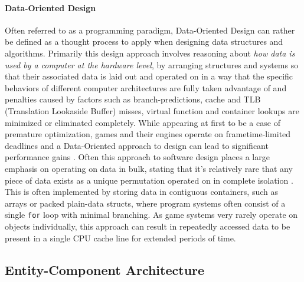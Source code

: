 \documentclass[10pt]{scrartcl}
\begin{document}
	\paragraph{Data-Oriented Design} %
	\label{par:data_oriented_design}
	Often referred to as a programming paradigm, Data-Oriented Design can rather be defined as a thought process to apply when designing data structures and algorithms. Primarily this design approach involves reasoning about \textit{how data is used by a computer at the hardware level}, by arranging structures and systems so that their associated data is laid out and operated on in a way that the specific behaviors of different computer architectures are fully taken advantage of and penalties caused by factors such as branch-predictions, cache and TLB (Translation Lookaside Buffer) misses, virtual function and container lookups are minimized or eliminated completely. While appearing at first to be a case of premature optimization, games and their engines operate on frametime-limited deadlines and a Data-Oriented approach to design can lead to significant performance gains \parencite{dice-cull}. Often this approach to software design places a large emphasis on operating on data in bulk, stating that it's relatively rare that any piece of data exists as a unique permutation operated on in complete isolation \parencite{dice-intro}.
	This is often implemented by storing data in contiguous containers, such as arrays or packed plain-data structs, where program systems often consist of a single \texttt{for} loop with minimal branching. As game systems very rarely operate on objects individually, this approach can result in repeatedly accessed data to be present in a single CPU cache line for extended periods of time.

	
	\subsection{Entity-Component Architecture} %
	\label{sub:entity_component_architecture}
\end{document}
